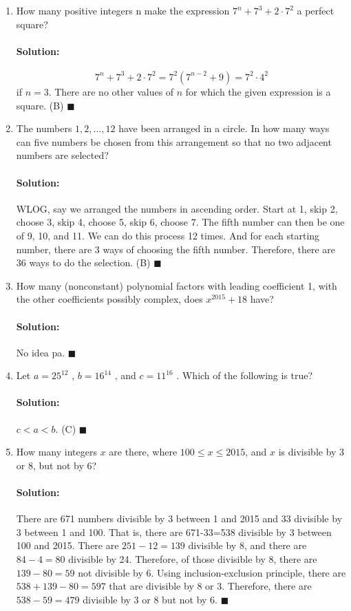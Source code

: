 \documentclass{article}
\newenvironment{solution}{\paragraph{Solution:}}{\hfill$\blacksquare$}
\begin{document}
\begin{enumerate}
	\item How many positive integers n make the expression $7^n + 7^3 + 2\cdot7^2$ a perfect square?
	
	\begin{solution}
		\begin{equation}
			7^n + 7^3 + 2\cdot 7^2 = 7^2(7^{n-2}+9)=7^2\cdot 4^2
		\end{equation}
		if $n=3$. There are no other values of $n$ for which the given expression is a square. (B)
	\end{solution}

	\item The numbers $1, 2,\ldots , 12$ have been arranged in a circle. In how many ways can five numbers
	be chosen from this arrangement so that no two adjacent numbers are selected?
	
	\begin{solution}
		WLOG, say we arranged the numbers in ascending order. Start at 1, skip 2, choose 3, skip 4, choose 5, skip 6, choose 7. The fifth number can then be one of 9, 10, and 11. We can do this process 12 times. And for each starting number, there are 3 ways of choosing the fifth number. Therefore, there are 36 ways to do the selection. (B)
	\end{solution}

	\item How many (nonconstant) polynomial factors with leading coefficient 1, with the other
	coefficients possibly complex, does $x^2015 + 18$ have?
	
	\begin{solution}
		No idea pa.
	\end{solution}

	\item Let $a = 25^{12}$ , $b = 16^{14}$ , and $c = 11^{16}$ . Which of the following is true?
	
	\begin{solution}
		$c < a < b$. (C)
	\end{solution}

	\item How many integers $x$ are there, where $100 \leq x \leq 2015$, and $x$ is divisible by 3 or 8, but
	not by 6?
	
	\begin{solution}
		There are 671 numbers divisible by 3 between 1 and 2015 and 33 divisible by 3 between 1 and 100. That is, there are 671-33=538 divisible by 3 between 100 and 2015. There are $251-12=139$ divisible by 8, and there are $84-4=80$ divisible by 24. Therefore, of those divisible by 8, there are $139-80=59$ not divisible by 6. Using inclusion-exclusion principle, there are $538+139-80=597$ that are divisible by 8 or 3. Therefore, there are $538-59=479$ divisible by 3 or 8 but not by 6.
	\end{solution}


\end{enumerate}
\end{document}
